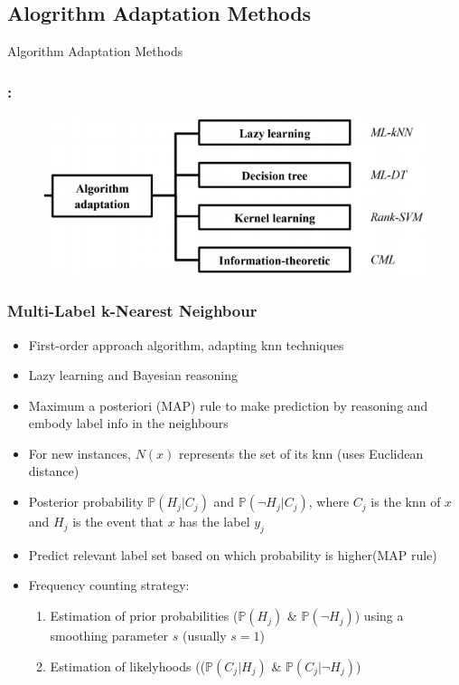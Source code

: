 \documentclass{beamer}
\begin{document}
\subsection{Alogrithm Adaptation Methods}
\begin{frame}
\Huge{\centerline{Algorithm Adaptation Methods}}
\end{frame}
\begin{frame}
\frametitle{\insertsection : \insertsubsection}
\begin{figure}
	\begin{center}
		\includegraphics[scale = 0.75]{images/aa.png}
	\end{center}
\end{figure}
\end{frame}
\begin{frame}
\frametitle{Multi-Label k-Nearest Neighbour}
\begin{itemize}
	\item First-order approach algorithm, adapting knn techniques
	\item Lazy learning and Bayesian reasoning
	\item Maximum a posteriori (MAP) rule to make prediction by reasoning and embody label info in the neighbours
	\item For new instances, $N(x)$ represents the set of its knn (uses Euclidean distance)
	\item Posterior probability $\mathbb{P}(H_j|C_j)$ and $\mathbb{P}(\neg H_j|C_j)$, where $C_j$ is the knn of $x$ and $H_j$ is the event that $x$ has the label $y_j$
	\item Predict relevant label set based on which probability is higher(MAP rule)
	\item Frequency counting strategy:
	\begin{enumerate}
		\item Estimation of prior probabilities ($\mathbb{P}(H_j)$ \& $\mathbb{P}(\neg H_j)$) using a smoothing parameter $s$ (usually $s=1$)
		\item Estimation of likelyhoods (($\mathbb{P}(C_j|H_j)$ \& $\mathbb{P}(C_j|\neg H_j)$)
	\end{enumerate}
	
\end{itemize}
\end{frame}
\end{document}

